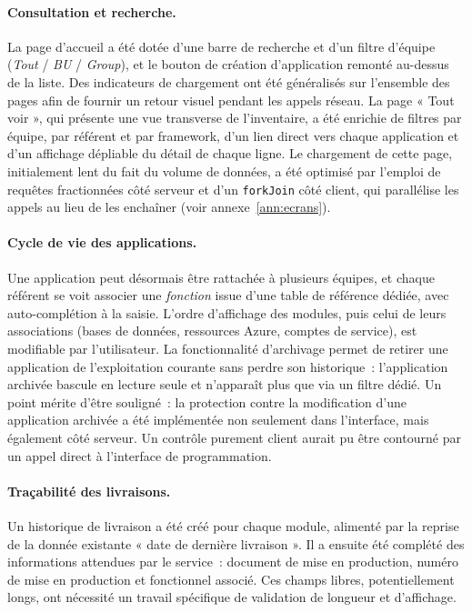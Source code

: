 \paragraph{Consultation et recherche.}
La page d'accueil a été dotée d'une barre de recherche et d'un filtre d'équipe
(\textit{Tout} / \textit{BU} / \textit{Group}), et le bouton de création
d'application remonté au-dessus de la liste. Des indicateurs de chargement ont
été généralisés sur l'ensemble des pages afin de fournir un retour visuel
pendant les appels réseau. La page « Tout voir », qui présente une vue
transverse de l'inventaire, a été enrichie de filtres par équipe, par référent
et par framework, d'un lien direct vers chaque application et d'un affichage
dépliable du détail de chaque ligne. Le chargement de cette page, initialement
lent du fait du volume de données, a été optimisé par l'emploi de requêtes
fractionnées côté serveur et d'un \texttt{forkJoin} côté client, qui parallélise
les appels au lieu de les enchaîner (voir annexe~\ref{ann:ecrans}).

\paragraph{Cycle de vie des applications.}
Une application peut désormais être rattachée à plusieurs équipes, et chaque
référent se voit associer une \textit{fonction} issue d'une table de référence
dédiée, avec auto-complétion à la saisie. L'ordre d'affichage des modules, puis
celui de leurs associations (bases de données, ressources Azure, comptes de
service), est modifiable par l'utilisateur. La fonctionnalité d'archivage
permet de retirer une application de l'exploitation courante sans perdre son
historique~: l'application archivée bascule en lecture seule et n'apparaît plus
que via un filtre dédié. Un point mérite d'être souligné~: la protection contre
la modification d'une application archivée a été implémentée non seulement dans
l'interface, mais également côté serveur. Un contrôle purement client aurait pu
être contourné par un appel direct à l'interface de programmation.

\paragraph{Traçabilité des livraisons.}
Un historique de livraison a été créé pour chaque module, alimenté par la
reprise de la donnée existante « date de dernière livraison ». Il a ensuite été
complété des informations attendues par le service~: document de mise en
production, numéro de mise en production et fonctionnel associé. Ces champs
libres, potentiellement longs, ont nécessité un travail spécifique de validation
de longueur et d'affichage.

